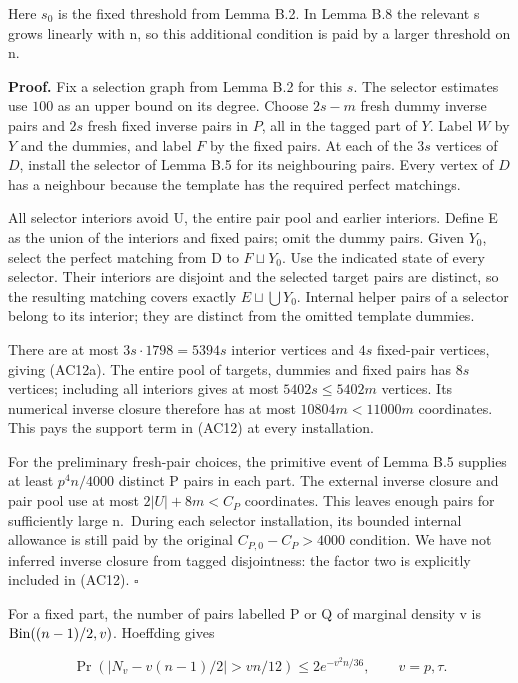 \documentclass[11pt,a4paper]{article}
\newcommand{\labelledparagraphstart}{\par\addvspace{3pt plus 1pt minus 1pt}\noindent}
\begin{document}
Here \(s_0\) is the fixed threshold from Lemma B.2. In Lemma B.8 the relevant s grows linearly with n, so this additional condition is paid by a larger threshold on n.

\labelledparagraphstart\textbf{Proof.} Fix a selection graph from Lemma B.2 for this \(s\). The selector estimates use \(100\) as an upper bound on its degree. Choose \(2s-m\) fresh dummy inverse pairs and \(2s\) fresh fixed inverse pairs in \(P\), all in the tagged part of \(Y\). Label \(W\) by \(Y\) and the dummies, and label \(F\) by the fixed pairs. At each of the \(3s\) vertices of \(D\), install the selector of Lemma B.5 for its neighbouring pairs. Every vertex of \(D\) has a neighbour because the template has the required perfect matchings.

All selector interiors avoid U, the entire pair pool and earlier interiors. Define E as the union of the interiors and fixed pairs; omit the dummy pairs. Given \(Y_0\), select the perfect matching from D to \(F\sqcup Y_0\). Use the indicated state of every selector. Their interiors are disjoint and the selected target pairs are distinct, so the resulting matching covers exactly \(E\sqcup \bigcup Y_0\). Internal helper pairs of a selector belong to its interior; they are distinct from the omitted template dummies.

There are at most \(3s\cdot 1798=5394s\) interior vertices and \(4s\) fixed-pair vertices, giving (AC12a). The entire pool of targets, dummies and fixed pairs has \(8s\) vertices; including all interiors gives at most \(5402s\le 5402m\) vertices. Its numerical inverse closure therefore has at most \(10804m<11000m\) coordinates. This pays the support term in (AC12) at every installation.

For the preliminary fresh-pair choices, the primitive event of Lemma B.5 supplies at least \(p^{4}n/4000\) distinct P pairs in each part. The external inverse closure and pair pool use at most \(2|U|+8m<C_P\) coordinates. This leaves enough pairs for sufficiently large n.~During each selector installation, its bounded internal allowance is still paid by the original \(C_{P,0}-C_P>4000\) condition. We have not inferred inverse closure from tagged disjointness: the factor two is explicitly included in (AC12). \(\square\)

For a fixed part, the number of pairs labelled P or Q of marginal density v is \({\rm Bin}((n-1)/2,v)\). Hoeffding gives

\begin{equation}
\Pr\left(\left|N_v-v(n-1)/2\right|>vn/12\right)
\leq2e^{-v^2n/36},\qquad v=p,\tau.
\tag{AC13}\label{eq:AC13}
\end{equation}
\end{document}
